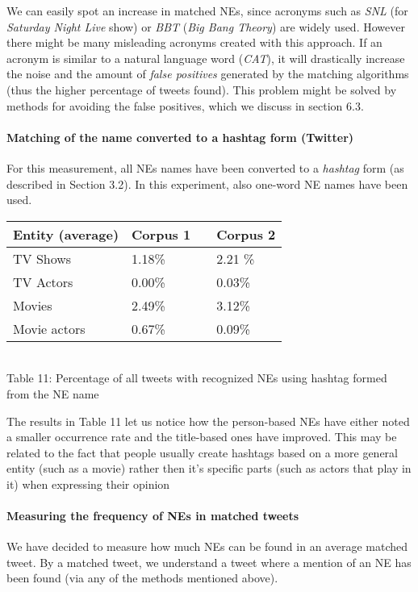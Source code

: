 We can easily spot an increase in matched NEs, since acronyms such as \textit{SNL}
(for \textit{Saturday Night Live} show) or \textit{BBT} (\textit{Big Bang Theory}) are widely used.
However there might be many misleading acronyms created with this approach. If an acronym is similar
to a natural language word (\eg \textit{CAT}), it will drastically increase the noise and the amount
of \textit{false positives} generated by the matching algorithms (thus the higher percentage of tweets
found). This problem might be solved by methods for avoiding the false positives, which we discuss in section 6.3.

\paragraph{Matching of the name converted to a hashtag form (Twitter)}
For this measurement, all NEs names have been converted to a \textit{hashtag} form (as described
in Section 3.2). In this experiment, also one-word NE names have been used.

\begin{center}
  \begin{tabular}{ | p{4cm} | p{2cm} | p{1cm}| p{2cm} | } \hline
    Entity (average) & Corpus 1 & & Corpus 2 \\ \hline
    TV Shows & 1.18\% & & 2.21 \% \\ \hline
    TV Actors & 0.00\% & & 0.03\% \\ \hline
    Movies & 2.49\% & & 3.12\% \\ \hline
    Movie actors & 0.67\% & & 0.09\% \\ \hline
  \end{tabular} \\
  Table 11: Percentage of all tweets with recognized NEs using hashtag formed from the NE name \\
\end{center}

The results in Table 11 let us notice how the person-based NEs have either noted a smaller
occurrence rate and the title-based ones have improved. This may be related to the
fact that people usually create hashtags based on a more general entity (such as
a movie) rather then it's specific parts (such as actors that play in it)
when expressing their opinion \cite{edinburg-corpus}

\paragraph{Measuring the frequency of NEs in matched tweets}
We have decided to measure how much NEs can be found in an average matched tweet. By a matched tweet,
we understand a tweet where a mention of an NE has been found (via any of the methods mentioned above).

